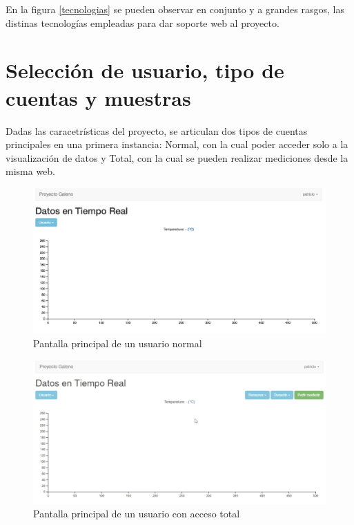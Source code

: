 En la figura \ref{tecnologias} se pueden observar en conjunto y a grandes rasgos, las distinas tecnologías empleadas para dar soporte web al proyecto.

\newpage


\section{Selección de usuario, tipo de cuentas y muestras}

Dadas las caracetrísticas del proyecto, se articulan dos tipos de cuentas principales en una primera instancia: Normal, con la cual poder acceder solo a la visualización de datos y Total, con la cual se pueden realizar mediciones desde la misma web. 

\begin{figure}[H]
	\centering
	\includegraphics[scale=0.3]{figuras/protof/normal.png}
	\caption{Pantalla principal de un usuario normal}
	\label{normal}
\end{figure}

\begin{figure}[H]
	\centering
	\includegraphics[scale=0.4]{figuras/protof/total.png}
	\caption{Pantalla principal de un usuario con acceso total}
	\label{total}
\end{figure}

